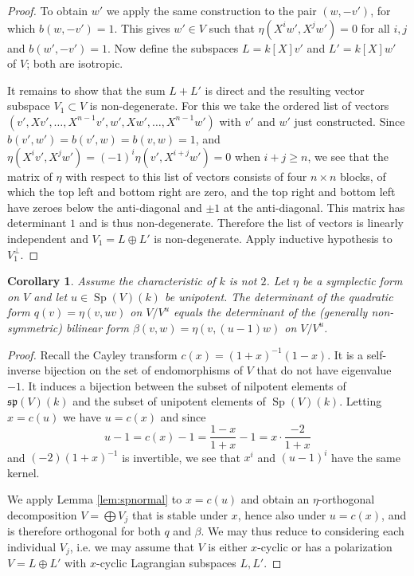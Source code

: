 \documentclass{article}
\def\mf#1{\mathfrak{#1}}
\DeclareMathOperator{\Sp}{Sp}
\newtheorem{cor}[thm]{Corollary}
\theoremstyle{definition}
\numberwithin{equation}{subsection}
\renewcommand{\-}{\hyp{}}
\begin{document}
\begin{appendices}
\begin{proof}
	To obtain $w'$ we apply the same construction to the pair $(w,-v')$, for which $b(w,-v')=1$. This gives $w' \in V$ such that $\eta(X^iw',X^jw')=0$ for all $i,j$ and $b(w',-v')=1$. Now define the subspaces $L=k[X]v'$ and $L'=k[X]w'$ of $V$; both are isotropic.

	It remains to show that the sum $L + L'$ is direct and the resulting vector subspace $V_1 \subset V$ is non-degenerate. For this we take the ordered list of vectors $(v',Xv',\dots,X^{n-1}v',w',Xw',\dots,X^{n-1}w')$ with $v'$ and $w'$ just constructed. Since $b(v',w')=b(v',w)=b(v,w)=1$, and $\eta(X^iv',X^jw')=(-1)^i\eta(v',X^{i+j}w')=0$ when $i+j \geq n$, we see that the matrix of $\eta$ with respect to this list of vectors consists of four $n \times n$ blocks, of which the top left and bottom right are zero, and the top right and bottom left have zeroes below the anti-diagonal and $\pm 1$ at the anti-diagonal. This matrix has determinant $1$ and is thus non-degenerate. Therefore the list of vectors is linearly independent and $V_1=L \oplus L'$ is non-degenerate. Apply inductive hypothesis to $V_1^\perp$.
\end{proof}

\begin{cor} \label{cor:spnormal}
Assume the characteristic of $k$ is not $2$. Let $\eta$ be a symplectic form on $V$ and let $u \in \Sp(V)(k)$ be unipotent. The determinant of the quadratic form $q(v)=\eta(v,uv)$ on $V/V^u$ equals the determinant of the (generally non-symmetric) bilinear form $\beta(v,w)=\eta(v,(u-1)w)$ on $V/V^u$.
\end{cor}
\begin{proof}
	Recall the Cayley transform $c(x)=(1+x)^{-1}(1-x)$. It is a self-inverse bijection on the set of endomorphisms of $V$ that do not have eigenvalue $-1$. It induces a bijection between the subset of nilpotent elements of $\mf{sp}(V)(k)$ and the subset of unipotent elements of $\Sp(V)(k)$. Letting $x=c(u)$ we have $u=c(x)$ and since 
	\[ u-1 = c(x)-1=\frac{1-x}{1+x}-1 = x\cdot \frac{-2}{1+x}\]
	and $(-2)(1+x)^{-1}$ is invertible, we see that $x^i$ and $(u-1)^i$ have the same kernel.

	We apply Lemma \ref{lem:spnormal} to $x=c(u)$ and obtain an $\eta$-orthogonal decomposition $V=\bigoplus V_j$ that is stable under $x$, hence also under $u=c(x)$, and is therefore orthogonal for both $q$ and $\beta$. We may thus reduce to considering each individual $V_j$, i.e. we may assume that $V$ is either $x$-cyclic or has a polarization $V=L \oplus L'$ with $x$-cyclic Lagrangian subspaces $L,L'$.


\end{proof}
\end{appendices}
\end{document}
